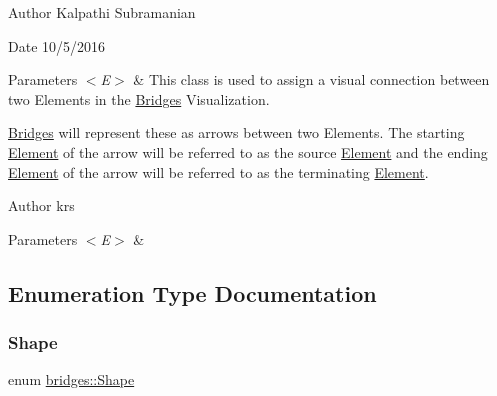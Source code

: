 \begin{DoxyAuthor}{Author}
Kalpathi Subramanian 
\end{DoxyAuthor}
\begin{DoxyDate}{Date}
10/5/2016
\end{DoxyDate}

\begin{DoxyParams}{Parameters}
{\em $<$\+E$>$} & This class is used to assign a visual connection between two Elements in the \hyperlink{namespacebridges_1_1_bridges}{Bridges} Visualization. \\
\hline
\end{DoxyParams}
\hyperlink{namespacebridges_1_1_bridges}{Bridges} will represent these as arrows between two Elements. The starting \hyperlink{classbridges_1_1_element}{Element} of the arrow will be referred to as the source \hyperlink{classbridges_1_1_element}{Element} and the ending \hyperlink{classbridges_1_1_element}{Element} of the arrow will be referred to as the terminating \hyperlink{classbridges_1_1_element}{Element}.

\begin{DoxyAuthor}{Author}
krs
\end{DoxyAuthor}

\begin{DoxyParams}{Parameters}
{\em $<$\+E$>$} & \\
\hline
\end{DoxyParams}


\subsection{Enumeration Type Documentation}
\hypertarget{namespacebridges_a1b4050586bd708782ae0d4f3b06b9579}{}\label{namespacebridges_a1b4050586bd708782ae0d4f3b06b9579} 
\subsubsection{\texorpdfstring{Shape}{Shape}}
{\footnotesize\ttfamily enum \hyperlink{namespacebridges_a1b4050586bd708782ae0d4f3b06b9579}{bridges\+::\+Shape}}

